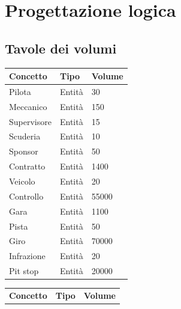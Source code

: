 \documentclass[11pt]{article}
\begin{document}
\section{Progettazione logica}

\subsection{Tavole dei volumi}
\begin{center}
    \begin{tabular}{ |l|l|l| }
        \hline
        \textbf{Concetto} & \textbf{Tipo} & \textbf{Volume} \\
        
        \hline
        Pilota & Entità & 30 \\
        \hline
        Meccanico & Entità & 150 \\
        \hline
        Supervisore & Entità & 15 \\
        \hline
        Scuderia & Entità & 10 \\
        \hline
        Sponsor & Entità & 50 \\
        \hline
        Contratto & Entità & 1400 \\
        \hline
        Veicolo & Entità & 20 \\
        \hline
        Controllo & Entità & 55000 \\ %
        \hline
        Gara & Entità & 1100 \\
        \hline
        Pista & Entità & 50 \\
        \hline
        Giro & Entità & 70000 \\ %
        \hline
        Infrazione & Entità & 20 \\
        \hline
        Pit stop & Entità & 20000 \\
        \hline
    \end{tabular}
        \quad
    \begin{tabular}{ |l|l|l| }
        \hline
        \textbf{Concetto} & \textbf{Tipo} & \textbf{Volume} \\


\end{tabular}
\end{center}
\end{document}
